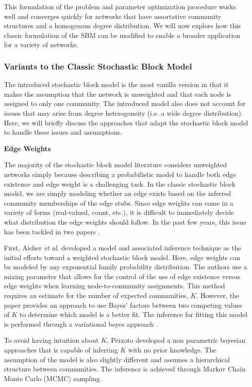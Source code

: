 This formulation of the problem and parameter optimization procedure works well and converges quickly for networks that have assortative community structures and a homogenous degree distribution. We will now explore how this classic formulation of the SBM can be modified to enable a broader application for a variety of networks.

\subsubsection{Variants to the Classic Stochastic Block Model}

The introduced stochastic block model is the most vanilla version in that it makes the assumption that the network is unweighted and that each node is assigned to only one community. The introduced model also does not account for issues that may arise from degree heterogeneity (i.e. a wide degree distribution).  Here, we will briefly discuss the approaches that adapt the stochastic block model to handle these issues and assumptions. 

{\bf Edge Weights}

\indent The majority of the stochastic block model literature considers unweighted networks simply because describing a probabilistic model to handle both edge existence and edge weight is a challenging task. In the classic stochastic block model, we are simply modeling whether an edge exists based on the inferred community memberships of the edge stubs. Since edge weights can come in a variety of forms (real-valued, count, etc.), it is difficult to immediately decide what distribution the edge weights should follow. In the past few years, this issue has been tackled in two papers \cite{aicher,peix}.

\indent First, Aicher \emph{et al.} developed a model and associated inference technique as the initial efforts toward a weighted stochastic block model. Here, edge weights can be modeled by any exponential family probability distribution. The authors use a mixing parameter that allows for the control of the use of edge existence versus edge weights when learning node-to-community assignments. This method requires an estimate for the number of expected communities, $K$. However, the paper provides an approach to use Bayes' factors between two competing values of $K$ to determine which model is a better fit. The inference for fitting this model is performed through a variational bayes approach \cite{vBayes}.

\indent To avoid having intuition about $K$, Peixoto \cite{peix} developed a non parametric bayesian approaches that is capable of inferring $K$ with no prior knowledge. The assumption of the model is also slightly different and assumes a hierarchical structure between communities. The inference is achieved through Markov Chain Monte Carlo (MCMC) sampling. 

